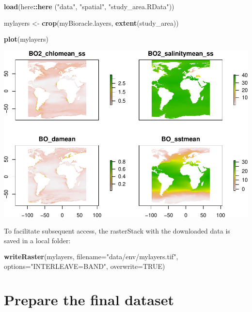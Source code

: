 \documentclass[
]{book}
\newenvironment{Shaded}{\begin{snugshade}}{\end{snugshade}}
\newcommand{\AttributeTok}[1]{\textcolor[rgb]{0.13,0.29,0.53}{#1}}
\newcommand{\ConstantTok}[1]{\textcolor[rgb]{0.56,0.35,0.01}{#1}}
\newcommand{\FunctionTok}[1]{\textcolor[rgb]{0.13,0.29,0.53}{\textbf{#1}}}
\newcommand{\NormalTok}[1]{#1}
\newcommand{\OtherTok}[1]{\textcolor[rgb]{0.56,0.35,0.01}{#1}}
\newcommand{\SpecialCharTok}[1]{\textcolor[rgb]{0.81,0.36,0.00}{\textbf{#1}}}
\newcommand{\StringTok}[1]{\textcolor[rgb]{0.31,0.60,0.02}{#1}}
\begin{document}
\begin{Shaded}
\begin{Highlighting}[]
\FunctionTok{load}\NormalTok{(here}\SpecialCharTok{::}\FunctionTok{here}\NormalTok{ (}\StringTok{"data"}\NormalTok{, }\StringTok{"spatial"}\NormalTok{, }\StringTok{"study\_area.RData"}\NormalTok{))}

\NormalTok{mylayers }\OtherTok{\textless{}{-}} \FunctionTok{crop}\NormalTok{(myBioracle.layers, }\FunctionTok{extent}\NormalTok{(study\_area))}

\FunctionTok{plot}\NormalTok{(mylayers)}
\end{Highlighting}
\end{Shaded}

\includegraphics{_main_files/figure-latex/unnamed-chunk-36-1.pdf}

To facilitate subsequent access, the rasterStack with the downloaded data is saved in a local folder:

\begin{Shaded}
\begin{Highlighting}[]
\FunctionTok{writeRaster}\NormalTok{(mylayers, }\AttributeTok{filename=}\StringTok{"data/env/mylayers.tif"}\NormalTok{, }\AttributeTok{options=}\StringTok{"INTERLEAVE=BAND"}\NormalTok{, }\AttributeTok{overwrite=}\ConstantTok{TRUE}\NormalTok{)}
\end{Highlighting}
\end{Shaded}

\chapter{Prepare the final dataset}\label{prepare-the-final-dataset}
\end{document}
